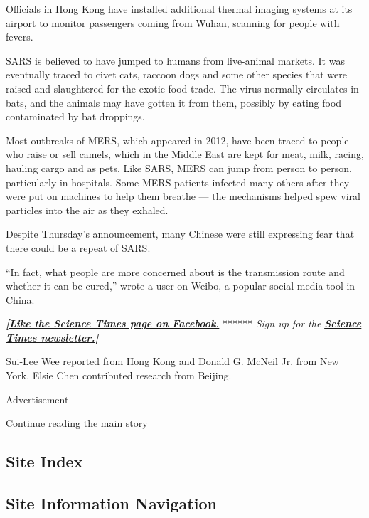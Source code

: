 Officials in Hong Kong have installed additional thermal imaging systems
at its airport to monitor passengers coming from Wuhan, scanning for
people with fevers.

SARS is believed to have jumped to humans from live-animal markets. It
was eventually traced to civet cats, raccoon dogs and some other species
that were raised and slaughtered for the exotic food trade. The virus
normally circulates in bats, and the animals may have gotten it from
them, possibly by eating food contaminated by bat droppings.

Most outbreaks of MERS, which appeared in 2012, have been traced to
people who raise or sell camels, which in the Middle East are kept for
meat, milk, racing, hauling cargo and as pets. Like SARS, MERS can jump
from person to person, particularly in hospitals. Some MERS patients
infected many others after they were put on machines to help them
breathe --- the mechanisms helped spew viral particles into the air as
they exhaled.

Despite Thursday's announcement, many Chinese were still expressing fear
that there could be a repeat of SARS.

``In fact, what people are more concerned about is the transmission
route and whether it can be cured,'' wrote a user on Weibo, a popular
social media tool in China.

\textbf{\emph{{[}}\href{http://on.fb.me/1paTQ1h}{\emph{Like the Science
Times page on Facebook.}}} ****** \emph{\textbar{} Sign up for the}
\textbf{\href{http://nyti.ms/1MbHaRU}{\emph{Science Times
newsletter.}}\emph{{]}}}

Sui-Lee Wee reported from Hong Kong and Donald G. McNeil Jr. from New
York. Elsie Chen contributed research from Beijing.

Advertisement

\protect\hyperlink{after-bottom}{Continue reading the main story}

\hypertarget{site-index}{%
\subsection{Site Index}\label{site-index}}

\hypertarget{site-information-navigation}{%
\subsection{Site Information
Navigation}\label{site-information-navigation}}

